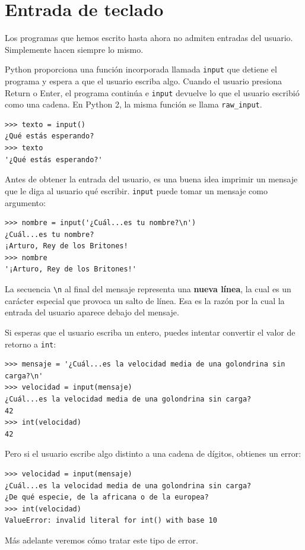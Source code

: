 \documentclass[10pt]{book}
\begin{document}
\section{Entrada de teclado}

Los programas que hemos escrito hasta ahora no admiten entradas del usuario.
Simplemente hacen siempre lo mismo.

Python proporciona una función incorporada llamada {\tt input} que
detiene el programa y
espera a que el usuario escriba algo.  Cuando el usuario presiona {\sf
  Return} o {\sf Enter}, el programa continúa e \verb"input"
devuelve lo que el usuario escribió como una cadena.  En Python 2, la misma
función se llama \verb"raw_input".

\begin{verbatim}
>>> texto = input()
¿Qué estás esperando?
>>> texto
'¿Qué estás esperando?'
\end{verbatim}
%
Antes de obtener la entrada del usuario, es una buena idea imprimir
un mensaje que le diga al usuario qué escribir.  \verb"input" puede tomar un
mensaje como argumento:

\begin{verbatim}
>>> nombre = input('¿Cuál...es tu nombre?\n')
¿Cuál...es tu nombre?
¡Arturo, Rey de los Britones!
>>> nombre
'¡Arturo, Rey de los Britones!'
\end{verbatim}
%
La secuencia \verb"\n" al final del mensaje representa una {\bf
  nueva línea}, la cual es un carácter especial que provoca un salto de línea.
Esa es la razón por la cual la entrada del usuario aparece debajo del mensaje.  

Si esperas que el usuario escriba un entero, puedes intentar convertir
el valor de retorno a {\tt int}:

\begin{verbatim}
>>> mensaje = '¿Cuál...es la velocidad media de una golondrina sin carga?\n'
>>> velocidad = input(mensaje)
¿Cuál...es la velocidad media de una golondrina sin carga?
42
>>> int(velocidad)
42
\end{verbatim}
%
Pero si el usuario escribe algo distinto a una cadena de dígitos,
obtienes un error:

\begin{verbatim}
>>> velocidad = input(mensaje)
¿Cuál...es la velocidad media de una golondrina sin carga?
¿De qué especie, de la africana o de la europea?
>>> int(velocidad)
ValueError: invalid literal for int() with base 10
\end{verbatim}
%
Más adelante veremos cómo tratar este tipo de error.
\end{document}
